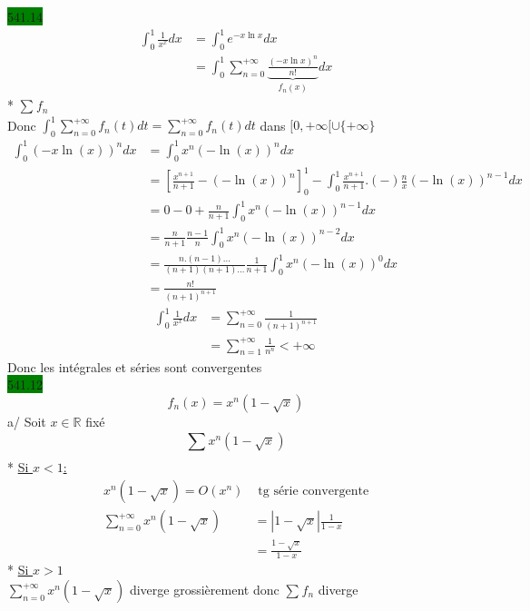\documentclass{article}
\begin{document}
\noindent \colorbox{green}{541.14}\\
\begin{align*}
  \int_{0}^{1}\frac{1}{x^{x}}dx &= \int_{0}^{1}e^{-x\ln x}dx \\
                                &= \int_{0}^{1}\sum_{n=0}^{+\infty} \underbrace{\frac{(-x\ln x)^{n}}{n!}}_{f_{n}(x)}dx
\end{align*}
* \(\sum_{}^{}f_{n}\) \\
Donc \(\int_{0}^{1}\sum_{n=0}^{+\infty}f_{n}(t) dt = \sum_{n=0}^{+\infty} f_{n}(t)dt\)
dans  \([0, +\infty[ \cup \{+\infty\}\)\\
\begin{align*}
  \int_{0}^{1}(-x\ln(x))^{n}dx &= \int_{0}^{1}x^{n} (-\ln(x))^{n}dx \\
                               &= [\frac{x^{n+1}}{n+1}- (-\ln(x))^{n}]^{1}_{0} - \int_{0}^{1}\frac{x^{n+1}}{n+1}.(-)\frac{n}{x}(-\ln(x))^{n-1}dx\\ 
                               &= 0 - 0 + \frac{n}{n+1}\int_{0}^{1}x^{n}(-\ln(x))^{n-1}dx \\
                               &= \frac{n}{n+1}\frac{n-1}{n}\int_{0}^{1}x^{n}(-\ln(x))^{n-2}dx \\
                               &= \frac{n.(n-1)\dots}{(n+1)(n+1)\dots}\frac{1}{n+1}\int_{0}^{1}x^{n}(-\ln(x))^{0}dx\\
                               &= \frac{n!}{(n+1)^{n+1}}
\end{align*}
\begin{align*}
  \int_{0}^{1}\frac{1}{x^{x}}dx &= \sum_{n=0}^{+\infty}\frac{1}{(n+1)^{n+1}}\\
                                &= \sum_{n=1}^{+\infty}\frac{1}{n^{n}} < +\infty
\end{align*}
Donc les intégrales et séries sont convergentes \\

\noindent \colorbox{green}{541.12}\\
\begin{equation*}
    f_{n}(x) = x^{n}(1-\sqrt{x})
\end{equation*}
a/ Soit \(x \in \mathbb{R}\) fixé\\ 
\begin{equation*}
    \sum_{}^{}x^{n}(1-\sqrt{x})
\end{equation*}
* \underline{Si \(x < 1\):}\\
\begin{align*}
  x^{n}(1-\sqrt{x})=O(x^{n}) &\text{ tg série convergente}\\
  \sum_{n=0}^{+\infty}x^{n}(1-\sqrt{x})&= |1-\sqrt{x}|\frac{1}{1-x}\\
                                       &= \frac{1-\sqrt{x}}{1-x}
\end{align*}
* \underline{Si \(x > 1\)}\\
\(\sum_{n=0}^{+\infty}x^{n}(1-\sqrt{x})\) diverge grossièrement donc 
\(\sum_{}^{}f_{n}\) diverge\\
\end{document}
